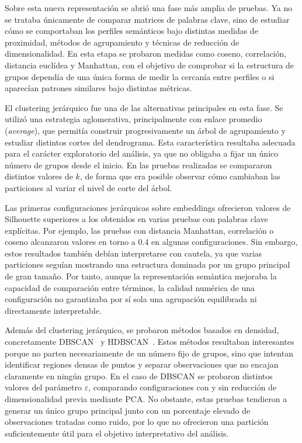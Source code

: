 \documentclass[11pt,spanish,listoffigures,listoftables]{tfgetsinf}
\begin{document}
Sobre esta nueva representación se abrió una fase más amplia de pruebas. Ya no se trataba únicamente de comparar matrices de palabras clave, sino de estudiar cómo se comportaban los perfiles semánticos bajo distintas medidas de proximidad, métodos de agrupamiento y técnicas de reducción de dimensionalidad. En esta etapa se probaron medidas como coseno, correlación, distancia euclídea y Manhattan, con el objetivo de comprobar si la estructura de grupos dependía de una única forma de medir la cercanía entre perfiles o si aparecían patrones similares bajo distintas métricas.

El clustering jerárquico fue una de las alternativas principales en esta fase. Se utilizó una estrategia aglomerativa, principalmente con enlace promedio (\textit{average}), que permitía construir progresivamente un árbol de agrupamiento y estudiar distintos cortes del dendrograma. Esta característica resultaba adecuada para el carácter exploratorio del análisis, ya que no obligaba a fijar un único número de grupos desde el inicio. En las pruebas realizadas se compararon distintos valores de \(k\), de forma que era posible observar cómo cambiaban las particiones al variar el nivel de corte del árbol.

Las primeras configuraciones jerárquicas sobre embeddings ofrecieron valores de Silhouette superiores a los obtenidos en varias pruebas con palabras clave explícitas. Por ejemplo, las pruebas con distancia Manhattan, correlación o coseno alcanzaron valores en torno a 0.4 en algunas configuraciones. Sin embargo, estos resultados también debían interpretarse con cautela, ya que varias particiones seguían mostrando una estructura dominada por un grupo principal de gran tamaño. Por tanto, aunque la representación semántica mejoraba la capacidad de comparación entre términos, la calidad numérica de una configuración no garantizaba por sí sola una agrupación equilibrada ni directamente interpretable.

Además del clustering jerárquico, se probaron métodos basados en densidad, concretamente DBSCAN~\cite{dbscan} y HDBSCAN~\cite{hdbscan}. Estos métodos resultaban interesantes porque no parten necesariamente de un número fijo de grupos, sino que intentan identificar regiones densas de puntos y separar observaciones que no encajan claramente en ningún grupo. En el caso de DBSCAN se probaron distintos valores del parámetro \(\varepsilon\), comparando configuraciones con y sin reducción de dimensionalidad previa mediante PCA. No obstante, estas pruebas tendieron a generar un único grupo principal junto con un porcentaje elevado de observaciones tratadas como ruido, por lo que no ofrecieron una partición suficientemente útil para el objetivo interpretativo del análisis.
\end{document}

